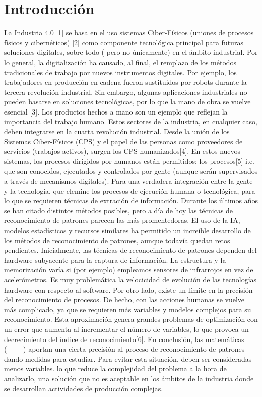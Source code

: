 \documentclass{article}
\begin{document}
\section{Introducción}
La Industria 4.0 [1] se basa en el uso sistemas Ciber-Físicos (uniones de procesos físicos y cibernéticos) [2] como componente tecnológica principal para futuras soluciones digitales, sobre todo  ( pero no únicamente) en el ámbito industrial. Por lo general, la digitalización ha causado, al final, el remplazo de los métodos tradicionales de trabajo por nuevos instrumentos digitales.
Por ejemplo, los trabajadores en producción en cadena fueron sustituidos por robots durante la tercera revolución industrial.
Sin embargo, algunas aplicaciones industriales no pueden basarse en soluciones tecnológicas, por lo que la mano de obra se vuelve esencial [3].  Los productos hechos a mano son un ejemplo que reflejan la importancia del trabajo humano. Estos sectores de la industria, en cualquier caso, deben integrarse en la cuarta revolución industrial. Desde la unión de los Sistemas Ciber-Físicos (CPS) y el papel de las personas como proveedores de servicios (trabajos activos), surgen los CPS humanizados[4]. En estos nuevos sistemas, los procesos dirigidos por humanos están permitidos; los procesos[5] i.e. que son conocidos, ejecutados y controlados por gente (aunque serán supervisados a través de mecanismos digitales).
Para una verdadera integración entre la gente y la tecnología, que elemine los procesos de ejecución humana o tecnológica, para lo que se requieren técnicas de extración de información. Durante los últimos años se han citado distintos métodos posibles, pero a día de hoy las técnicas de reconocimiento de patrones parecen las más promentedoras.
El uso de la IA, modelos estadísticos y recursos similares ha permitido un increíble desarrollo de los métodos de reconocimiento de patrones, aunque todavía quedan retos pendientes.
Inicialmente, las técnicas de reconocimiento de patrones dependen del hardware subyacente para la captura de información. La estructura y la memorización varía si (por ejemplo)   empleamos sensores de infrarrojos en vez de acelerómetros. Es muy problemática la velocicidad de evolución de las tecnologías hardware con respecto al software. 
Por otro lado, existe un límite en la precisión del reconocimiento de procesos. De hecho, con las acciones humanas se vuelve más complicado, ya que se requieren más variables y modelos complejos para su reconocimiento. Esta aproximación genera grandes problemas de optimización con un error que aumenta al incrementar el número de variables, lo que provoca un decrecimiento del índice de reconocimiento[6]. En conclusión, las matemáticas (-------) aportan una cierta precisión al proceso de reconocimiento de patrones dando medidas para estudiar. Para evitar esta situación, deben ser consideradas menos variables. lo que reduce la complejidad del problema a la hora de analizarlo, una solución que no es aceptable en los ámbitos de la industria donde se desarrollan actividades de producción complejas.
\end{document}
